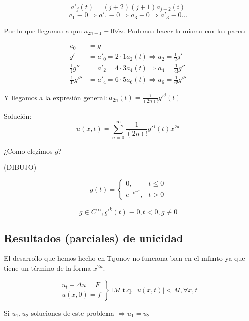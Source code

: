  			\[ a'_j(t) = (j+2)(j+1) a_{j+2} (t)\]
 			\[a_1 \equiv 0 \Rightarrow a'_1 \equiv 0 \Rightarrow a_3 \equiv 0 \Rightarrow a'_3 \equiv 0 …\]

 			Por lo que llegamos a que $a_{2n+1} = 0 \forall n$. Podemos hacer lo mismo con los pares:

 			\begin{align*}
 				a_0 &= g \\
 				g' &= a'_0 = 2 \cdot 1 a_2 (t) \Rightarrow a_2 = \frac{1}{2} g' \\
 				\frac{1}{2}g'' &= a'_2 = 4 \cdot 3 a_4 (t) \Rightarrow a_4 = \frac{1}{4!} g'' \\
 				\frac{1}{4!}g''' &= a'_4 = 6 \cdot 5 a_6 (t) \Rightarrow a_6 = \frac{1}{6!} g'''
 			\end{align*}

 			Y llegamos a la expresión general: $a_{2n} (t) = \frac{1}{(2n)!} g'^{j} (t)$

 			Solución:
 				\[ u(x,t) = \sum_{n=0}^\infty  \frac{1}{(2n)!} g'^{j} (t) x^{2n}\]

 			¿Como elegimos $g$?

 			(DIBUJO)

 			\[ g(t) = \begin{cases}
 				0,& t \leq 0 \\
 				e^{-t^{-\alpha}},&  t>0
 			\end{cases}\]

 			\[ g \in C^\infty, g'^k(t) \equiv 0, t < 0, g \not\equiv 0\]

 		\subsection{Resultados (parciales) de unicidad}

 			El desarrollo que hemos hecho en Tijonov no funciona bien en el infinito ya que tiene un término de la forma $x^{2n}$.

 			\begin{theorem}
 				\[\left.\begin{array}{r}
 					u_t - \Delta u = F \\
 					u(x,0) = f
 				\end{array}\right\} \exists M \text{ t.q. } |u(x,t)| < M, \forall x, t \]

 				Si $u_1, u_2$ soluciones de este problema $\Rightarrow u_1 = u_2$
 			\end{theorem}

